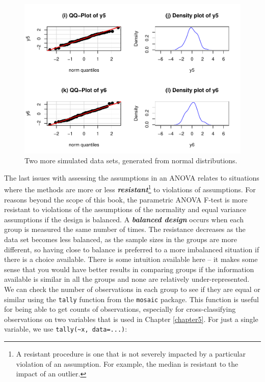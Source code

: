 \documentclass[]{book}
\let\rmarkdownfootnote\footnote%
\def\footnote{\protect\rmarkdownfootnote}
\begin{document}
\begin{figure}
\centering
\includegraphics{GreenwoodBanner_files/figure-latex/Figure3-13-1.pdf}
\caption{\label{fig:Figure3-13}Two more simulated data sets, generated from normal
distributions.}
\end{figure}

The last issues with assessing the assumptions in an ANOVA relates to
situations where the methods are more or less
\textbf{\emph{resistant}}\footnote{A resistant procedure is one that is
  not severely impacted by a particular violation of an assumption. For
  example, the median is resistant to the impact of an outlier.} to
violations of assumptions. For reasons beyond the scope of this book,
the parametric ANOVA F-test is more resistant to violations of the
assumptions of the normality and equal variance assumptions if the
design is balanced. A \textbf{\emph{balanced design}} occurs when each
group is measured the same number of times. The resistance decreases as
the data set becomes less balanced, as the sample sizes in the groups
are more different, so having close to balance is preferred to a more
imbalanced situation if there is a choice available. There is some
intuition available here -- it makes some sense that you would have
better results in comparing groups if the information available is
similar in all the groups and none are relatively under-represented. We
can check the number of observations in each group to see if they are
equal or similar using the \texttt{tally} function from the
\texttt{mosaic} package. This function is useful for being able to get
counts of observations, especially for cross-classifying observations on
two variables that is used in Chapter \ref{chapter5}. For just a single
variable, we use \texttt{tally(\textasciitilde{}x,\ data=...)}:
\end{document}
